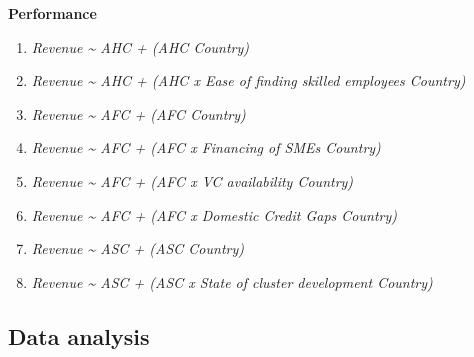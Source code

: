 \documentclass[
  english,
  man]{apa6}
\providecommand{\tightlist}{%
  \setlength{\itemsep}{0pt}\setlength{\parskip}{0pt}}
\begin{document}
\textbf{Performance}

\begin{enumerate}
\def\labelenumi{(\arabic{enumi})}
\setcounter{enumi}{16}
\tightlist
\item
  \emph{Revenue \textasciitilde{} AHC + (AHC \textbar{} Country)}
\item
  \emph{Revenue \textasciitilde{} AHC + (AHC x Ease of finding skilled employees \textbar{} Country)}
\item
  \emph{Revenue \textasciitilde{} AFC + (AFC \textbar{} Country)}
\item
  \emph{Revenue \textasciitilde{} AFC + (AFC x Financing of SMEs\textbar{} Country)}\\
\item
  \emph{Revenue \textasciitilde{} AFC + (AFC x VC availability \textbar{} Country)}\\
\item
  \emph{Revenue \textasciitilde{} AFC + (AFC x Domestic Credit Gaps \textbar{} Country)}\\
\item
  \emph{Revenue \textasciitilde{} ASC + (ASC \textbar{} Country)}\\
\item
  \emph{Revenue \textasciitilde{} ASC + (ASC x State of cluster development \textbar{} Country)}
\end{enumerate}

\hypertarget{data-analysis}{%
\subsection{Data analysis}\label{data-analysis}}
\end{document}
